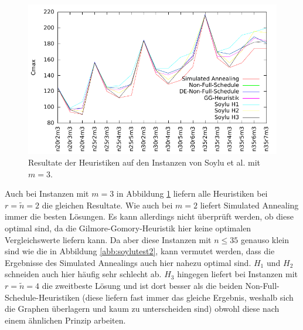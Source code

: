 \documentclass{scrreprt}
\begin{document}
\begin{figure}
    \begin{center}
        \includegraphics[width=.8\textwidth]{../instances/soylu/plotm3.pdf}
    \end{center}
    \caption{
        \label{abb:soylutest3}
        Resultate der Heuristiken auf den Instanzen von Soylu et al. mit $m=3$.
    }
\end{figure}
Auch bei Instanzen mit $m=3$ in Abbildung \ref{abb:soylutest3} liefern alle Heuristiken bei $r=\tilde{n}=2$ die gleichen Resultate.
Wie auch bei $m=2$ liefert Simulated Annealing immer die besten Lösungen.
Es kann allerdings nicht überprüft werden, ob diese optimal sind, da die Gilmore-Gomory-Heuristik hier keine optimalen Vergleichswerte liefern kann.
Da aber diese Instanzen mit $n\leq 35$ genauso klein sind wie die in Abbildung \ref{abb:soylutest2}, kann vermutet werden,
dass die Ergebnisse des Simulated Annealings auch hier nahezu optimal sind.
$H_1$ und $H_2$ schneiden auch hier häufig sehr schlecht ab. 
$H_3$ hingegen liefert bei Instanzen mit $r=\tilde{n}=4$ die zweitbeste Lösung und ist dort besser als die beiden Non-Full-Schedule-Heuristiken 
(diese liefern fast immer das gleiche Ergebnis, weshalb sich die Graphen überlagern und kaum zu unterscheiden sind)
obwohl diese nach einem ähnlichen Prinzip arbeiten.
\end{document}
